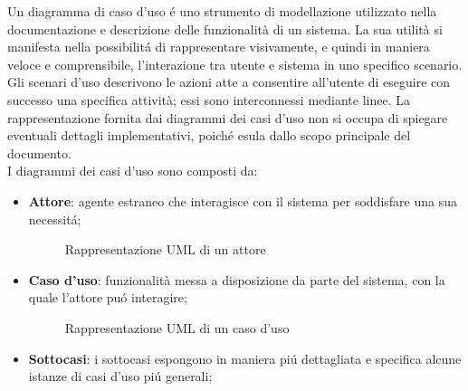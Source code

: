 Un diagramma di caso d'uso é uno strumento di modellazione utilizzato nella documentazione e descrizione delle funzionalità di un sistema. La sua utilità si manifesta nella possibilitá di rappresentare visivamente, e quindi in maniera veloce e comprensibile, l'interazione tra utente e sistema in uno specifico scenario. Gli scenari d'uso descrivono le azioni atte a consentire all'utente di eseguire con successo una specifica attività; essi sono interconnessi mediante linee. La rappresentazione fornita dai diagrammi dei casi d'uso non si occupa di spiegare eventuali dettagli implementativi, poiché esula dallo scopo principale del documento.\\
I diagrammi dei casi d'uso sono composti da:\\
\begin{itemize}
    \item \textbf{Attore}: agente estraneo che interagisce con il sistema per soddisfare una sua necessitá;
        \begin{figure}[ht!]
            \centering
            \caption{Rappresentazione UML di un attore}
            \label{fig:Rappresentazione UML di un attore}
        \end{figure}
    \item \textbf{Caso d'uso}: funzionalità messa a disposizione da parte del sistema, con la quale l'attore puó interagire;
        \begin{figure}[ht!]
        \centering
        \caption{Rappresentazione UML di un caso d'uso}
        \label{fig:Rappresentazione UML di un caso d'uso}
        \end{figure}
    \item \textbf{Sottocasi}: i sottocasi espongono in maniera piú dettagliata e specifica alcune istanze di casi d'uso piú generali; 
        \begin{figure}[ht!]
            \centering
\end{figure}
\end{itemize}
